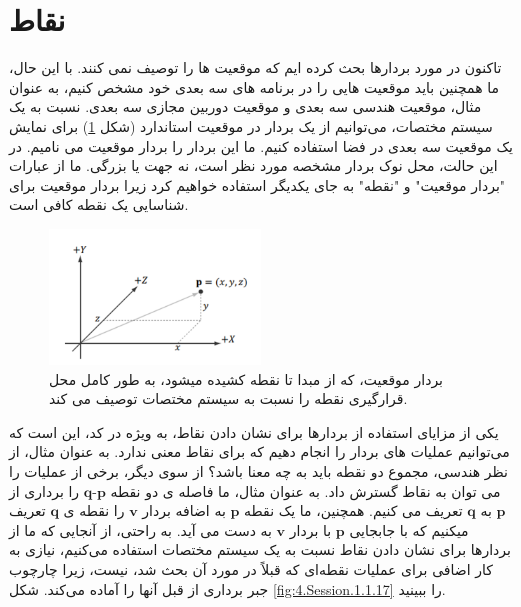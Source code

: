 \section{\textbf{نقاط}}
\label{sec:1.5}
{
    \Large
    \begin{spacing}{1.5}
        تاکنون در مورد بردارها بحث کرده ایم که موقعیت ها را توصیف نمی کنند.
        با این حال، ما همچنین باید موقعیت هایی را در برنامه های سه بعدی خود مشخص کنیم،
        به عنوان مثال، موقعیت هندسی سه بعدی و موقعیت دوربین مجازی سه بعدی.
        نسبت به یک سیستم مختصات، می‌توانیم از یک بردار در موقعیت استاندارد (شکل \ref{fig:4.Session.1.1.16}) برای نمایش یک موقعیت سه بعدی در فضا استفاده کنیم.
        ما این بردار را بردار موقعیت می نامیم.
        در این حالت، محل نوک بردار مشخصه مورد نظر است، نه جهت یا بزرگی.
        ما از عبارات "بردار موقعیت" و "نقطه" به جای یکدیگر استفاده خواهیم کرد زیرا بردار موقعیت برای شناسایی یک نقطه کافی است.

        \begin{figure}[H]
            \centering
            \setlength{\belowcaptionskip}{-10pt}
            \includegraphics[width=0.5\textwidth]{Images/4/1/4.Session.1.1.16}
            \caption {بردار موقعیت، که از مبدا تا نقطه کشیده میشود، به طور کامل محل قرارگیری نقطه را نسبت به سیستم مختصات توصیف می کند.}
            \label{fig:4.Session.1.1.16}
        \end{figure}

        یکی از مزایای استفاده از بردارها برای نشان دادن نقاط، به ویژه در کد، این است که می‌توانیم عملیات های بردار را انجام دهیم که برای نقاط معنی ندارد.
        به عنوان مثال، از نظر هندسی، مجموع دو نقطه باید به چه معنا باشد؟
        از سوی دیگر، برخی از عملیات را می توان به نقاط گسترش داد.
        به عنوان مثال، ما فاصله ی دو نقطه $\textbf{q}\textbf{-p}$ را برداری از $\textbf{p}$ به $\textbf{q}$ تعریف می کنیم. همچنین، ما یک نقطه $\textbf{p}$ به اضافه بردار $\textbf{v}$ را نقطه ی $\textbf{q}$ تعریف میکنیم که با جابجایی $\textbf{p}$ با بردار $\textbf{v}$ به دست می آید.
        به راحتی، از آنجایی که ما از بردارها برای نشان دادن نقاط نسبت به یک سیستم مختصات استفاده می‌کنیم، نیازی به کار اضافی برای عملیات نقطه‌ای که قبلاً در مورد آن بحث شد، نیست، زیرا چارچوب جبر برداری از قبل آنها را آماده می‌کند. شکل \ref{fig:4.Session.1.1.17} را ببینید.


\end{spacing}}
